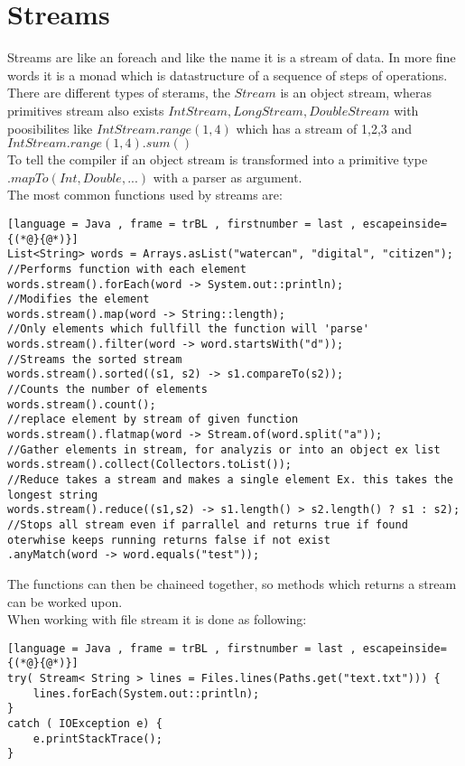 \documentclass[12pt, a4paper]{article}
\begin{document}
	\section{Streams}
		Streams are like an foreach and like the name it is a stream of data. In more fine words it is a monad which is datastructure of a sequence of steps of operations.\\
		There are different types of sterams, the $Stream$ is an object stream, wheras primitives stream also exists $IntStream, LongStream, DoubleStream$ with poosibilites like $IntStream.range(1,4)$ which has a stream of 1,2,3 and \\$IntStream.range(1,4).sum()$\\
		To tell the compiler if an object stream is transformed into a primitive type $.mapTo(Int,Double,...)$ with a parser as argument.\\
		The most common functions used by streams are:
\begin{lstlisting}[language = Java , frame = trBL , firstnumber = last , escapeinside={(*@}{@*)}]
List<String> words = Arrays.asList("watercan", "digital", "citizen");
//Performs function with each element
words.stream().forEach(word -> System.out::println);
//Modifies the element
words.stream().map(word -> String::length);
//Only elements which fullfill the function will 'parse'
words.stream().filter(word -> word.startsWith("d"));
//Streams the sorted stream
words.stream().sorted((s1, s2) -> s1.compareTo(s2)); 
//Counts the number of elements
words.stream().count();
//replace element by stream of given function
words.stream().flatmap(word -> Stream.of(word.split("a")); 
//Gather elements in stream, for analyzis or into an object ex list
words.stream().collect(Collectors.toList());
//Reduce takes a stream and makes a single element Ex. this takes the longest string
words.stream().reduce((s1,s2) -> s1.length() > s2.length() ? s1 : s2);
//Stops all stream even if parrallel and returns true if found oterwhise keeps running returns false if not exist
.anyMatch(word -> word.equals("test"));
\end{lstlisting}
		The functions can then be chaineed together, so methods which returns a stream can be worked upon.\\
		When working with file stream it is done as following:
\begin{lstlisting}[language = Java , frame = trBL , firstnumber = last , escapeinside={(*@}{@*)}]
try( Stream< String > lines = Files.lines(Paths.get("text.txt"))) {
	lines.forEach(System.out::println);
}
catch ( IOException e) {
	e.printStackTrace();
}
\end{lstlisting}
\end{document}

